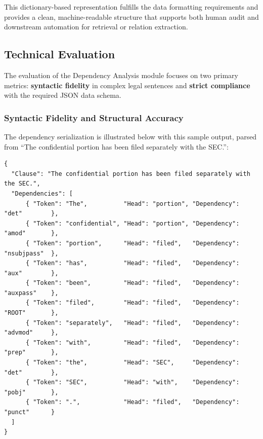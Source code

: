 \documentclass[twoside,final]{hcmut-report}
\begin{document}
This dictionary-based representation fulfills the data formatting requirements and provides a clean, machine-readable structure that supports both human audit and downstream automation for retrieval or relation extraction.

\subsection{Technical Evaluation}
The evaluation of the Dependency Analysis module focuses on two primary metrics: \textbf{syntactic fidelity} in complex legal sentences and \textbf{strict compliance} with the required JSON data schema.

\subsubsection*{Syntactic Fidelity and Structural Accuracy}
The dependency serialization is illustrated below with this sample output, parsed from ``The confidential portion has been filed separately with the SEC.'':
\begin{verbatim}
{
  "Clause": "The confidential portion has been filed separately with the SEC.",
  "Dependencies": [
      { "Token": "The",          "Head": "portion", "Dependency": "det"        },
      { "Token": "confidential", "Head": "portion", "Dependency": "amod"       },
      { "Token": "portion",      "Head": "filed",   "Dependency": "nsubjpass"  },
      { "Token": "has",          "Head": "filed",   "Dependency": "aux"        },
      { "Token": "been",         "Head": "filed",   "Dependency": "auxpass"    },
      { "Token": "filed",        "Head": "filed",   "Dependency": "ROOT"       },
      { "Token": "separately",   "Head": "filed",   "Dependency": "advmod"     },
      { "Token": "with",         "Head": "filed",   "Dependency": "prep"       },
      { "Token": "the",          "Head": "SEC",     "Dependency": "det"        },
      { "Token": "SEC",          "Head": "with",    "Dependency": "pobj"       },
      { "Token": ".",            "Head": "filed",   "Dependency": "punct"      }
  ]
}
\end{verbatim}
\end{document}
